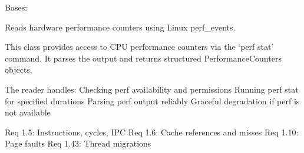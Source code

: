 \documentclass[letterpaper,10pt,english]{sphinxmanual}
\begin{document}
\begin{fulllineitems}
\label{\detokenize{core.readers.perf_reader:core.readers.perf_reader.PerfReader}}
\pysigstartsignatures
\pysiglinewithargsret
{}
{}
{}
\pysigstopsignatures
\sphinxAtStartPar
Bases: 

\sphinxAtStartPar
Reads hardware performance counters using Linux perf\_events.

\sphinxAtStartPar
This class provides access to CPU performance counters via the ‘perf stat’
command. It parses the output and returns structured PerformanceCounters
objects.

\sphinxAtStartPar
The reader handles:
\sphinxhyphen{} Checking perf availability and permissions
\sphinxhyphen{} Running perf stat for specified durations
\sphinxhyphen{} Parsing perf output reliably
\sphinxhyphen{} Graceful degradation if perf is not available

\sphinxAtStartPar
Req 1.5: Instructions, cycles, IPC
Req 1.6: Cache references and misses
Req 1.10: Page faults
Req 1.43: Thread migrations

\begin{fulllineitems}
\label{\detokenize{core.readers.perf_reader:core.readers.perf_reader.PerfReader.DEFAULT_EVENTS}}
\pysigstartsignatures
\pysigline
{}
\pysigstopsignatures
\end{fulllineitems}


\end{fulllineitems}
\end{document}
